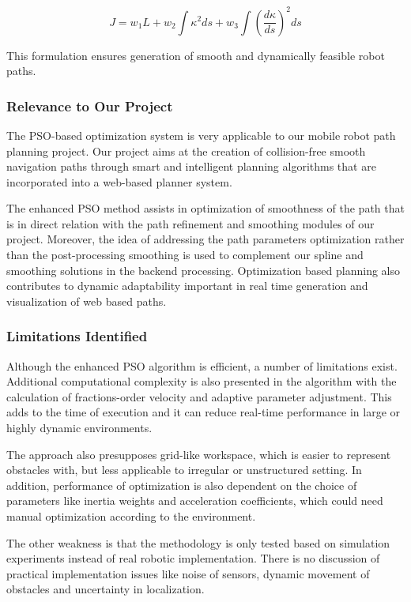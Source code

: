 \begin{equation}
J = w_1 L + w_2 \int \kappa^2 ds + w_3 \int \left(\frac{d\kappa}{ds}\right)^2 ds
\end{equation}

This formulation ensures generation of smooth and dynamically feasible robot paths.

\subsubsection{Relevance to Our Project}

The PSO-based optimization system is very applicable to our mobile robot path planning project. Our project aims at the creation of collision-free smooth navigation paths through smart and intelligent planning algorithms that are incorporated into a web-based planner system.

The enhanced PSO method assists in optimization of smoothness of the path that is in direct relation with the path refinement and smoothing modules of our project. Moreover, the idea of addressing the path parameters optimization rather than the post-processing smoothing is used to complement our spline and smoothing solutions in the backend processing. Optimization based planning also contributes to dynamic adaptability important in real time generation and visualization of web based paths.

\subsubsection{Limitations Identified}

Although the enhanced PSO algorithm is efficient, a number of limitations exist. Additional computational complexity is also presented in the algorithm with the calculation of fractions-order velocity and adaptive parameter adjustment. This adds to the time of execution and it can reduce real-time performance in large or highly dynamic environments.

The approach also presupposes grid-like workspace, which is easier to represent obstacles with, but less applicable to irregular or unstructured setting. In addition, performance of optimization is also dependent on the choice of parameters like inertia weights and acceleration coefficients, which could need manual optimization according to the environment.

The other weakness is that the methodology is only tested based on simulation experiments instead of real robotic implementation. There is no discussion of practical implementation issues like noise of sensors, dynamic movement of obstacles and uncertainty in localization.



